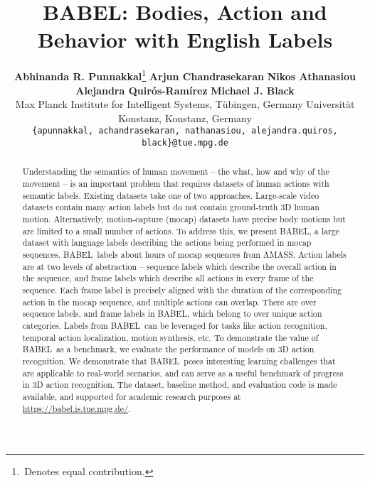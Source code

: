 \documentclass[final]{cvpr}
\def\babel{BABEL}
\begin{document}
\title{BABEL: Bodies, Action and Behavior with English Labels}

\author{
    \textbf{Abhinanda R. Punnakkal}\thanks{\,Denotes equal contribution.}  \qquad
    \textbf{Arjun Chandrasekaran} \qquad 
    \textbf{Nikos Athanasiou} \qquad \\
    \textbf{Alejandra Quirós-Ramírez} \qquad 
    \textbf{Michael J. Black} \qquad \\
    \small{Max Planck Institute for Intelligent Systems, T\"{u}bingen, Germany \quad
    Universit\"{a}t Konstanz, Konstanz, Germany} \\
    {\tt\small \{apunnakkal, achandrasekaran, nathanasiou, alejandra.quiros, black\}@tue.mpg.de} 
}

\maketitle

\begin{abstract}
Understanding the semantics of human movement -- the what, how and why of the movement -- is an important problem that requires datasets of human actions with semantic labels. 
Existing datasets take one of two approaches.
Large-scale video datasets contain many action labels but do not contain ground-truth 3D human motion.
Alternatively, motion-capture (mocap) datasets have precise body motions but are limited to a small number of actions. 
To address this, we present \babel, a large dataset with language labels describing the actions being performed in mocap sequences. 
\babel~labels about  hours of mocap sequences from AMASS.
Action labels are at two levels of abstraction -- sequence labels which describe the overall action in the sequence, and frame labels which describe all actions in every frame of the sequence. 
Each frame label is precisely aligned with the duration of the corresponding action in the mocap sequence, and multiple actions can overlap. 
There are over  sequence labels, and  frame labels in BABEL, which belong to over  unique action categories. 
Labels from \babel~can be leveraged for tasks like action recognition, temporal action localization, motion synthesis, etc. 
To demonstrate the value of \babel~as a benchmark, we evaluate the performance of models on 3D action recognition. 
We demonstrate that \babel~poses interesting learning challenges that are applicable to real-world scenarios, and can serve as a useful benchmark of progress in 3D action recognition. 
The dataset, baseline method, and evaluation code is made available, and supported for academic research purposes at \url{https://babel.is.tue.mpg.de/}.
\end{abstract}
\end{document}
